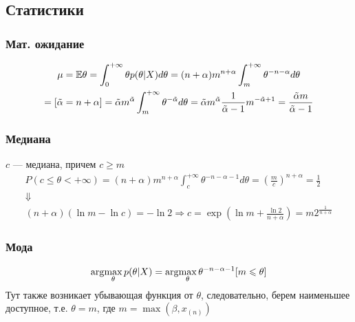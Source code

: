 \subsection{Статистики}
\subsubsection{Мат. ожидание}
\begin{solution}
    \begin{gather}
        \mu = \mathbb{E} \theta = \int_0^{+\infty} \theta p(\theta | X) d\theta = (n + \alpha) m^{n + \alpha} \int_m^{+\infty}\theta^{-n - \alpha} d\theta \\
        = [\tilde{\alpha} = n + \alpha] = \tilde{\alpha}m^{\tilde{\alpha}}\int_m^{+\infty}\theta^{-\tilde{\alpha}} d\theta = \tilde{\alpha} m^{\tilde{\alpha}} \frac{1}{\tilde{\alpha} - 1} m^{-\tilde{\alpha} + 1} = \frac{\tilde{\alpha}m}{\tilde{\alpha} - 1}
    \end{gather}
\end{solution}

\subsubsection{Медиана}
\begin{solution}
    $c$ --- медиана, причем $c \ge m$
    \begin{gather}
        P(c \le \theta < +\infty) = (n + \alpha)m^{n + \alpha}\int_c^{+\infty} \theta^{-n - \alpha - 1} d\theta = \left(\frac{m}{c}\right)^{n + \alpha} = \frac12 \\
        \Downarrow \\
        (n + \alpha)(\ln m - \ln c) = -\ln 2 \Longrightarrow c = \exp(\ln m + \frac{\ln 2}{n + \alpha}) = m 2^{\frac{1}{n + \alpha}}
    \end{gather}
\end{solution}

\subsubsection{Мода}
\begin{solution}
    \begin{gather}
        \arg\!\max_{\theta} p(\theta | X) = \arg\!\max_{\theta} \theta^{-n - \alpha - 1}[m \leqslant \theta]
    \end{gather}
    Тут также возникает убывающая функция от $\theta$, следовательно, берем наименьшее доступное, т.е. $\theta = m$, где $m = \max(\beta, x_{(n)})$
\end{solution}
